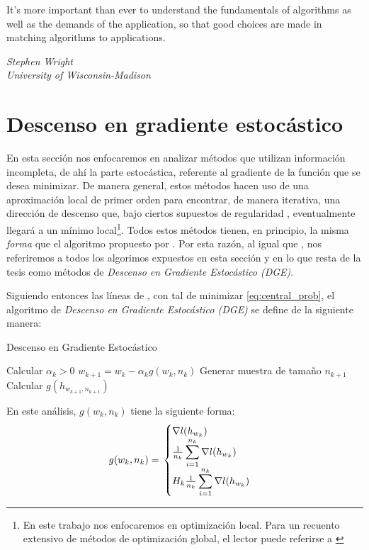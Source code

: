 \documentclass{book}
\theoremstyle{plain}
\theoremstyle{definition}
\theoremstyle{remark}
\begin{document}
\epigraph{It’s more important than ever to understand the fundamentals of
algorithms as well as the demands of the application, so that good
choices are made in matching algorithms to applications.}{\textit{Stephen Wright \\ University of Wisconsin-Madison}}
\newpage        

\section{Descenso en gradiente estocástico}

En esta sección nos enfocaremos en analizar métodos que utilizan información incompleta, de ahí la parte estocástica, referente al gradiente de la función que se desea minimizar. De manera general, estos métodos hacen uso de una aproximación local de primer orden para encontrar, de manera iterativa, una dirección de descenso que, bajo ciertos supuestos de regularidad \cite{NOCEDAL}, eventualmente llegará a un mínimo local\footnote{En este trabajo nos enfocaremos en optimización local. Para un recuento extensivo de métodos de optimización global, el lector puede referirse a \cite{TORN}}. Todos estos métodos tienen, en principio, la misma \emph{forma} que el algoritmo propuesto por \cite{ROBBINS}. Por esta razón, al igual que \cite{BOTTOU}, nos referiremos a todos los algorimos expuestos en esta sección y en lo que resta de la tesis como métodos de \emph{Descenso en Gradiente Estocástico (DGE)}. 

Siguiendo entonces las líneas de \cite{BOTTOU}, con tal de minimizar \ref{eq:central_prob}, el algoritmo de \emph{Descenso en Gradiente Estocástico (DGE)} se define de la siguiente manera:

 \begin{algorithm}
   \caption{Descenso en Gradiente Estocástico}
    \begin{algorithmic}[1]
        \State Calcular $\alpha_k > 0$
        \State $w_{k+1} = w_k - \alpha_kg(w_k, n_k)$
        \State Generar muestra de tamaño $n_{k+1}$
        \State Calcular $g(h_{w_{k+1}, n_{k+1}})$
        \EndWhile
       \EndFunction
\end{algorithmic}
\end{algorithm}

En este análisis, $g(w_k, n_k)$ tiene la siguiente forma:
\[ 
g(w_k, n_k) = \\
\begin{cases} 
      \nabla l(h_{w_k}) \\
      \frac{1}{n_k}\displaystyle\sum_{i=1}^{n_k}\nabla l(h_{w_k}) \\
      H_k \frac{1}{n_k}\displaystyle\sum_{i=1}^{n_k}\nabla l(h_{w_k})
   \end{cases}
\]
\end{document}
